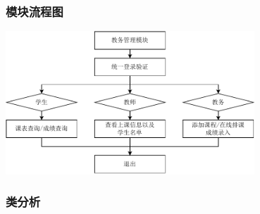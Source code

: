 \documentclass{article}
\begin{document}
\subsubsection{模块流程图}
\begin{center}
\includegraphics[width=0.7\textwidth]{fig/affair-flowchart.pdf}
\end{center}

\newpage

\subsubsection{类分析}
\end{document}
